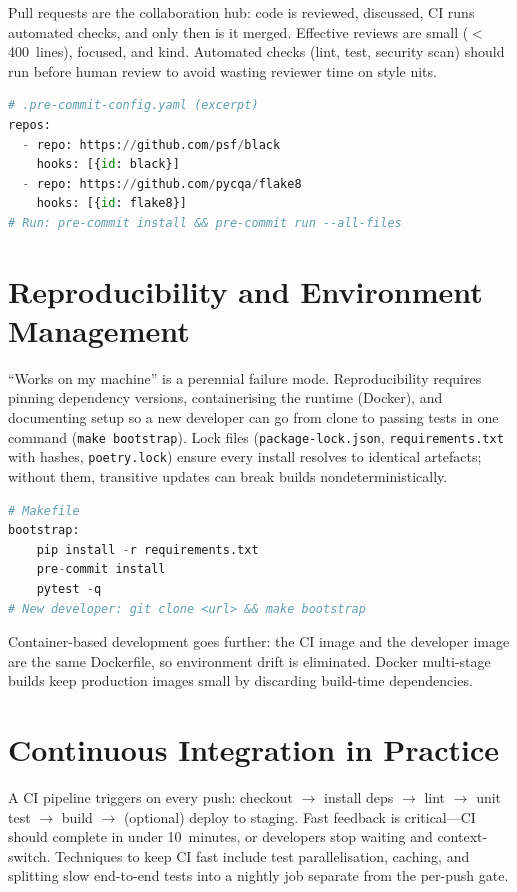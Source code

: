 Pull requests are the collaboration hub: code is reviewed, discussed, CI runs automated checks, and only then is it merged. Effective reviews are small ($<$400~lines), focused, and kind. Automated checks (lint, test, security scan) should run before human review to avoid wasting reviewer time on style nits.

\begin{lstlisting}[language=Python,caption={Pre-commit checks save reviewer time.}]
# .pre-commit-config.yaml (excerpt)
repos:
  - repo: https://github.com/psf/black
    hooks: [{id: black}]
  - repo: https://github.com/pycqa/flake8
    hooks: [{id: flake8}]
# Run: pre-commit install && pre-commit run --all-files
\end{lstlisting}



\section{Reproducibility and Environment Management}

``Works on my machine'' is a perennial failure mode. Reproducibility requires pinning dependency versions, containerising the runtime (Docker), and documenting setup so a new developer can go from clone to passing tests in one command (\texttt{make bootstrap}). Lock files (\texttt{package-lock.json}, \texttt{requirements.txt} with hashes, \texttt{poetry.lock}) ensure every install resolves to identical artefacts; without them, transitive updates can break builds nondeterministically.

\begin{lstlisting}[language=Python,caption={One-command bootstrap for reproducibility.}]
# Makefile
bootstrap:
	pip install -r requirements.txt
	pre-commit install
	pytest -q
# New developer: git clone <url> && make bootstrap
\end{lstlisting}

Container-based development goes further: the CI image and the developer image are the same Dockerfile, so environment drift is eliminated. Docker multi-stage builds keep production images small by discarding build-time dependencies.

\section{Continuous Integration in Practice}

A CI pipeline triggers on every push: checkout $\to$ install deps $\to$ lint $\to$ unit test $\to$ build $\to$ (optional) deploy to staging. Fast feedback is critical---CI should complete in under 10~minutes, or developers stop waiting and context-switch. Techniques to keep CI fast include test parallelisation, caching, and splitting slow end-to-end tests into a nightly job separate from the per-push gate.

